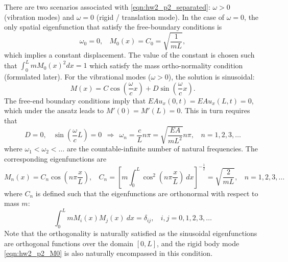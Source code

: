 There are two scenarios associated with \cref{eqn:hw2_p2_separated}: $\omega > 0$ (vibration modes) and $\omega = 0$ (rigid / translation mode).
In the case of $\omega = 0$, the only spatial eigenfunction that satisfy the free-boundary conditions is 
\begin{equation}\label{eqn:hw2_p2_M0}
    \boxed{\omega_0 = 0, ~~~~ M_0(x) = C_0 = \sqrt{\frac{1}{mL}}},
\end{equation}
which implies a constant displacement. 
The value of the constant is chosen such that $\int_0^L m {M_0(x)}^2 dx = 1$ which satisfy the mass ortho-normality condition (formulated later). 
For the vibrational modes ($\omega > 0$), the solution is sinusoidal:
\begin{equation}
    M(x) = C \cos\left(\frac{\omega}{c} x\right) + D \sin\left(\frac{\omega}{c} x\right).
\end{equation}
The free-end boundary conditions imply that $EAu_x(0, t) = EAu_x(L, t) = 0$, which under the ansatz leads to $M'(0) = M'(L) = 0$. 
This in turn requires that
\begin{equation}
    D = 0, ~~~~ \sin\left(\frac{\omega}{c}L\right) = 0 ~~ \Rightarrow ~~ \boxed{\omega_n = \frac{c}{L} n\pi = \sqrt{\frac{EA}{mL^2}} n\pi, ~~~~ n = 1, 2, 3, \ldots}
\end{equation}
where $\omega_1 < \omega_2 < \ldots$ are the countable-infinite number of natural frequencies.
The corresponding eigenfunctions are
\begin{equation}\label{eqn:hw2_p2_eigenfunctions}
    \boxed{M_n(x) = C_n \cos\left( n\pi \frac{x}{L}\right), ~~~~ C_n = {\left[m\int_0^L \cos^2\left(n\pi \frac{x}{L} \right) ~dx\right]}^{-\frac{1}{2}} = \sqrt{\frac{2}{mL}}, ~~~~ n = 1, 2, 3, \ldots}
\end{equation}
where $C_n$ is defined such that the eigenfunctions are orthonormal with respect to mass $m$: 
\begin{equation}\label{eqn:hw2_p2_orthonormality}
    \int_0^L m M_i(x)M_j(x) ~dx = \delta_{ij}, ~~~~ i, j = 0, 1, 2, 3, \ldots
\end{equation}
Note that the orthogonality is naturally satisfied as the sinusoidal eigenfunctions are orthogonal functions over the domain $[0, L]$, and the rigid body mode \cref{eqn:hw2_p2_M0} is also naturally encompassed in this condition.

